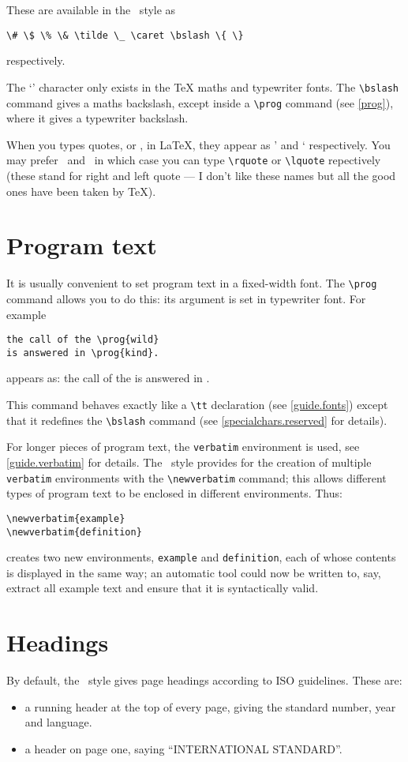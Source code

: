 These are available in the \iso\ style as
\begin{verbatim}
\# \$ \% \& \tilde \_ \caret \bslash \{ \}
\end{verbatim}
respectively.

The `\bslash' character only exists in the TeX maths and typewriter fonts.
The \verb|\bslash| command gives a maths backslash, except inside a
\verb|\prog| command (see \ref{prog}), where it gives a typewriter
backslash.

When you types quotes, \prog{\rquote} or \prog{\lquote}, in LaTeX, they
appear as ' and ` respectively.
You may prefer \rquote\ and \lquote\ in which case you can type
\verb|\rquote| or \verb|\lquote| repectively (these stand for right and
left quote --- I don't like these names but all the good ones have been
taken by TeX).

\section{Program text}
\label{prog}
It is usually convenient to set program text in a fixed-width font.
The \verb|\prog| command allows you to do this: its argument is set in
typewriter font.
For example
\begin{verbatim}
the call of the \prog{wild}
is answered in \prog{kind}.
\end{verbatim}
appears as: 
the call of the 
is answered in .

This command behaves exactly like a \verb|\tt| declaration (see
\ref{guide.fonts}) except that it redefines the \verb|\bslash|
command (see \ref{specialchars.reserved} for details).

\label{newverb}
For longer pieces of program text, the \verb|verbatim| environment
is used, see \ref{guide.verbatim} for details.
The \iso\ style provides for the creation of multiple \verb|verbatim|
environments with the \verb|\newverbatim| command; this allows different
types of program text to be enclosed in different environments.
Thus:
\begin{verbatim}
\newverbatim{example}
\newverbatim{definition}
\end{verbatim}
creates two new environments, \verb|example| and \verb|definition|,
each of whose contents is displayed in the same way; an automatic
tool could now be written to, say, extract all example text and ensure
that it is syntactically valid.

\section{Headings}
By default, the \iso\ style gives page headings according to ISO guidelines.
These are:
\begin{itemize}
\item a running header at the top of every page, giving
    the standard number, year and language.
\item a header on page one, saying ``INTERNATIONAL STANDARD''.
\end{itemize}

